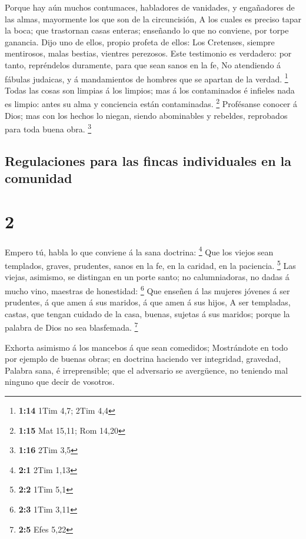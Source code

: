  Porque hay aún muchos contumaces, habladores de
vanidades, y engañadores de las almas, mayormente los que son de la
circuncisión,  A los cuales es preciso tapar la boca; que
trastornan casas enteras; enseñando lo que no conviene, por torpe
ganancia.  Dijo uno de ellos, propio profeta de ellos:
Los Cretenses, siempre mentirosos, malas bestias, vientres perezosos.
 Este testimonio es verdadero: por tanto, repréndelos
duramente, para que sean sanos en la fe,  No atendiendo á
fábulas judaicas, y á mandamientos de hombres que se apartan de la
verdad. \footnote{\textbf{1:14} 1Tim 4,7; 2Tim 4,4} 
Todas las cosas son limpias á los limpios; mas á los contaminados é
infieles nada es limpio: antes su alma y conciencia están contaminadas.
\footnote{\textbf{1:15} Mat 15,11; Rom 14,20}  Profésanse
conocer á Dios; mas con los hechos lo niegan, siendo abominables y
rebeldes, reprobados para toda buena obra. \footnote{\textbf{1:16} 2Tim
  3,5}

\hypertarget{regulaciones-para-las-fincas-individuales-en-la-comunidad}{%
\subsection{Regulaciones para las fincas individuales en la
comunidad}\label{regulaciones-para-las-fincas-individuales-en-la-comunidad}}

\hypertarget{section-1}{%
\section{2}\label{section-1}}

 Empero tú, habla lo que conviene á la sana doctrina:
\footnote{\textbf{2:1} 2Tim 1,13}  Que los viejos sean
templados, graves, prudentes, sanos en la fe, en la caridad, en la
paciencia. \footnote{\textbf{2:2} 1Tim 5,1}  Las viejas,
asimismo, se distingan en un porte santo; no calumniadoras, no dadas á
mucho vino, maestras de honestidad: \footnote{\textbf{2:3} 1Tim 3,11}
 Que enseñen á las mujeres jóvenes á ser prudentes, á que
amen á sus maridos, á que amen á sus hijos,  A ser
templadas, castas, que tengan cuidado de la casa, buenas, sujetas á sus
maridos; porque la palabra de Dios no sea blasfemada. \footnote{\textbf{2:5}
  Efes 5,22}

 Exhorta asimismo á los mancebos á que sean comedidos;
 Mostrándote en todo por ejemplo de buenas obras; en
doctrina haciendo ver integridad, gravedad,  Palabra sana,
é irreprensible; que el adversario se avergüence, no teniendo mal
ninguno que decir de vosotros.


